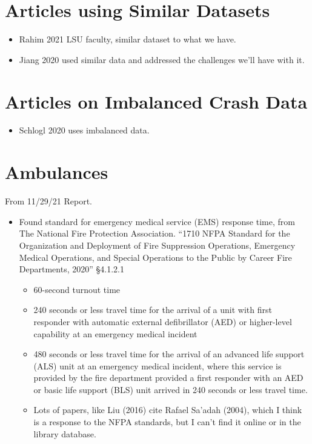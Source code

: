 \section{Articles using Similar Datasets}

\begin{itemize}
	\item Rahim 2021 \cite{RAHIM2021106090} LSU faculty, similar dataset to what we have.  
	\item Jiang 2020 \cite{JIANG2020105520} used similar data and addressed the challenges we'll have with it.  
	
\end{itemize}

\section{Articles on Imbalanced Crash Data}

\begin{itemize}
	\item  Schlogl 2020 \cite{SCHLOGL2020105398} uses imbalanced data.
\end{itemize}

\section{Ambulances}

From 11/29/21 Report.

\begin{itemize}
	\item Found standard for emergency medical service (EMS) response time, from The National Fire Protection Association.
	``1710 NFPA Standard for the Organization and Deployment of Fire Suppression Operations, Emergency Medical Operations,  and Special Operations to the Public by Career Fire Departments, 2020''
	  \S 4.1.2.1
	\begin{itemize}
		\item 60-second turnout time 
		\item 240  seconds  or  less  travel  time  for  the  arrival  of  a  unit with  first  responder  with  automatic  external  defibrillator (AED) or higher-level capability at an emergency medical incident
		\item 480 seconds or less travel time for the arrival of an advanced  life  support  (ALS)  unit  at  an  emergency  medical  incident,  where  this  service  is  provided  by  the  fire department  provided  a  first  responder  with  an  AED  or basic  life  support  (BLS)  unit  arrived  in  240  seconds  or less travel time.
		\item Lots of papers, like Liu (2016)\cite{Liu_2016} cite Rafael Sa'adah (2004), which I think is a response to the NFPA standards, but I can't find it online or in the library database.
	\end{itemize}	
\end{itemize}

